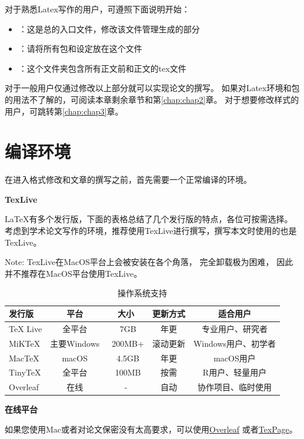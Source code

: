 对于熟悉Latex写作的用户，可遵照下面说明开始：
\begin{itemize}
    \item {}：这是总的入口文件，修改该文件管理生成的部分
    \item {}：请将所有包和设定放在这个文件
    \item {}：这个文件夹包含所有正文前和正文的tex文件
\end{itemize}

对于一般用户仅通过修改以上部分就可以实现论文的撰写。
如果对Latex环境和包的用法不了解的，可阅读本章剩余章节和第\ref{chap:chap2}章。
对于想要修改样式的用户，可跳转第\ref{chap:chap3}章。

\section{编译环境}
\label{sec:compliment_evn}

在进入格式修改和文章的撰写之前，首先需要一个正常编译的环境。

{\textbf{\large  TexLive}}

\LaTeX 有多个发行版，下面的表格总结了几个发行版的特点，各位可按需选择。
考虑到学术论文写作的环境，推荐使用TexLive进行撰写，撰写本文时使用的也是TexLive。

Note: TexLive在MacOS平台上会被安装在各个角落，
完全卸载\footnotemark 极为困难，
因此并不推荐在MacOS平台使用TexLive。

\begin{table}[htbp]
\centering
\caption{操作系统支持}
\label{tab:sys_support}
\begin{tabular}{lcccc}
\toprule
\textbf{发行版} & \textbf{平台} & \textbf{大小} & \textbf{更新方式} & \textbf{适合用户} \\
\midrule
TeX Live & 全平台 & ~7GB & 年更 & 专业用户、研究者 \\
MiKTeX & 主要Windows & ~200MB+ & 滚动更新 & Windows用户、初学者 \\
MacTeX & macOS & ~4.5GB & 年更 & macOS用户 \\
TinyTeX & 全平台 & ~100MB & 按需 & R用户、轻量用户 \\
Overleaf & 在线 & - & 自动 & 协作项目、临时使用 \\
\bottomrule
\end{tabular}
\end{table}

{\textbf{\large  在线平台}}

如果您使用Mac或者对论文保密没有太高要求，可以使用\href{https://www.overleaf.com/}{Overleaf}
或者\href{https://www.texpage.com/}{TexPage}。

